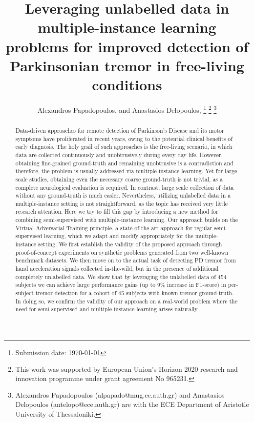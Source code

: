 \documentclass[journal,twoside,web]{ieeecolor}
\begin{document}
\title{Leveraging unlabelled data in
	multiple-instance learning problems for improved detection of 
	Parkinsonian tremor in free-living conditions}
\author{Alexandros Papadopoulos, and Anastasios Delopoulos, 
  \thanks{ Submission date: \today}
  \thanks{ This work was supported by European Union’s Horizon 2020 research and
  innovation programme under grant agreement No 965231.} 
  \thanks{Alexandros
  Papadopoulos (alpapado@mug.ee.auth.gr) and Anastasios Delopoulos
  (antelopo@ece.auth.gr) are with the ECE Department of Aristotle University of
  Thessaloniki. } 
}

\maketitle

\begin{abstract}
    Data-driven approaches for remote detection of Parkinson's Disease and its
    motor symptoms have proliferated in recent years, owing to the potential
    clinical benefits of early diagnosis. The holy grail of such approaches is
    the free-living scenario, in which data are collected continuously and
    unobtrusively during every day life. However, obtaining fine-grained
    ground-truth and remaining unobtrusive is a contradiction and therefore, the
    problem is usually addressed via multiple-instance learning. Yet for large
    scale  studies, obtaining even the necessary coarse ground-truth is not
    trivial, as a complete neurological evaluation is required. In contrast,
    large scale collection of data without any ground-truth is much easier.
    Nevertheless, utilizing unlabelled data in a multiple-instance setting is
    not straightforward, as the topic has received very little research
    attention.  Here we try to fill this gap by introducing a new method for
    combining semi-supervised with multiple-instance learning. Our approach
    builds on the Virtual Adversarial Training principle, a state-of-the-art
    approach for regular semi-supervised learning, which we adapt and modify
    appropriately for the multiple-instance setting. We first establish the
    validity of the proposed approach through proof-of-concept experiments on
    synthetic problems generated from two well-known benchmark datasets.  We
    then move on to the actual task of detecting PD tremor from hand
    acceleration signals collected in-the-wild, but in the presence of
    additional completely unlabelled data. We show that by leveraging the
    unlabelled data of 454 subjects we can achieve large performance gains
    (up to 9\% increase in F1-score)  in per-subject tremor detection for a
    cohort of 45 subjects with known tremor ground-truth. In doing so, we
    confirm the validity of our approach on a real-world problem where the need
    for semi-supervised and multiple-instance learning arises naturally.
\end{abstract}
\end{document}

